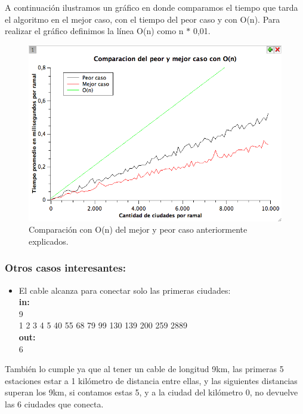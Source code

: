 A continuación ilustramos un gráfico en donde comparamos el tiempo que tarda el algoritmo en el mejor caso, con el tiempo del peor caso y con O(n). Para realizar el gráfico definimos la línea O(n) como n $*$ 0,01.

\begin{figure}[H]
\begin{center}

  \includegraphics[width=\linewidth]{../graficos/ej1/PeorYMejorCasoVsOn.png}
  \caption{{\small Comparación con O(n) del mejor y peor caso anteriormente explicados. }} \label{ej1-tiempo-vs-cant-ciudadades-mejor-peor-caso}
\endminipage

\end{center}
\end{figure}


\subsubsection{Otros casos interesantes:}
\begin{itemize}
\item El cable alcanza para conectar solo las primeras ciudades:\\
\textbf{in:}\\
9\\
1 2 3 4 5 40 55 68 79 99 130 139 200 259 2889\\
\textbf{out:}\\
6\\

\end{itemize}

También lo cumple ya que al tener un cable de longitud 9km, las primeras 5 estaciones estar a 1 kilómetro de distancia entre ellas, y las siguientes distancias superan los 9km, si contamos estas 5, y a la ciudad del kilómetro 0, no devuelve las 6 ciudades que conecta.\\

